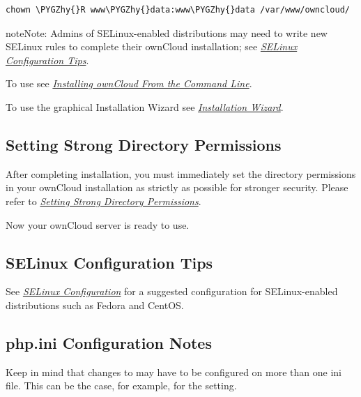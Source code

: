 \documentclass[letterpaper,10pt,english]{sphinxmanual}
\def\PYGZhy{\char`\-}
\begin{document}
\begin{Verbatim}[commandchars=\\\{\}]
chown \PYGZhy{}R www\PYGZhy{}data:www\PYGZhy{}data /var/www/owncloud/
\end{Verbatim}

\begin{notice}{note}{Note:}
Admins of SELinux-enabled distributions may need to write new SELinux
rules to complete their ownCloud installation; see
{\hyperref[installation/source_installation:selinux-tips-label]{\emph{SELinux Configuration Tips}}}.
\end{notice}

To use  see {\hyperref[installation/command_line_installation::doc]{\emph{Installing ownCloud From the Command Line}}}.

To use the graphical Installation Wizard see {\hyperref[installation/installation_wizard::doc]{\emph{Installation Wizard}}}.


\subsection{Setting Strong Directory Permissions}
\label{installation/source_installation:setting-strong-directory-permissions}
After completing installation, you must immediately set the directory
permissions in your ownCloud installation as strictly as possible for stronger
security. Please refer to {\hyperref[installation/installation_wizard:strong-perms-label]{\emph{Setting Strong Directory Permissions}}}.

Now your ownCloud server is ready to use.


\subsection{SELinux Configuration Tips}
\label{installation/source_installation:selinux-configuration-tips}\label{installation/source_installation:selinux-tips-label}
See {\hyperref[installation/selinux_configuration::doc]{\emph{SELinux Configuration}}} for a suggested configuration for
SELinux-enabled distributions such as Fedora and CentOS.


\subsection{php.ini Configuration Notes}
\label{installation/source_installation:php-ini-configuration-notes}\label{installation/source_installation:php-ini-tips-label}
Keep in mind that changes to  may have to be configured on more than one
ini file. This can be the case, for example, for the  setting.
\end{document}
